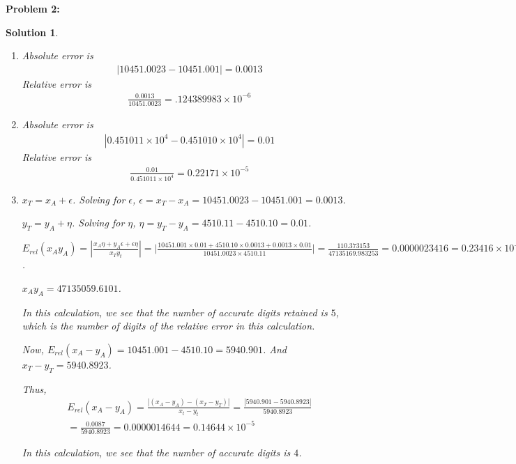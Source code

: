 \documentclass[12pt, letterpaper]{article}
\theoremstyle{nonumberplain}
\newtheorem{sol}{Solution}
\begin{document}
\newpage

\hspace{18pt}\textbf{Problem 2:} \medskip
\begin{sol}
	\begin{enumerate}[label=\alph*)]
		\item Absolute error is
		      \begin{gather*}
			      |10451.0023 - 10451.001| = 0.0013
		      \end{gather*}
		      Relative error is
		      \begin{gather*}
			      \frac{0.0013}{10451.0023} = .124389983 \times 10^{-6}
		      \end{gather*}
		\item Absolute error is
		      \begin{gather*}
			      |0.451011 \times 10^4 - 0.451010\times 10^4| = 0.01
		      \end{gather*}
		      Relative error is
		      \begin{gather*}
			      \frac{0.01}{0.451011\times 10^4} = 0.22171 \times 10^{-5}
		      \end{gather*}
		\item $x_T = x_A + \epsilon$. Solving for $\epsilon$, $\epsilon = x_T - x_A = 10451.0023 - 10451.001 = 0.0013$.

		      $y_T = y_A + \eta$. Solving for $\eta$, $\eta = y_T - y_A = 4510.11 - 4510.10 = 0.01$.

		      $E_{rel}(x_Ay_A) = | \frac{x_A\eta + y_A\epsilon + \epsilon \eta}{x_Ty_t} | = \Big|  \frac{10451.001 \times 0.01 + 4510.10 \times 0.0013 + 0.0013 \times 0.01}{10451.0023 \times 4510.11} | = \frac{110.373153}{47135169.983253} = 0.0000023416 = 0.23416\times 10^{-5}$.

		      $x_Ay_A = 47135059.6101$.

		      In this calculation, we see that the number of accurate digits retained is $5$, which is the number of digits of the relative error in this calculation.

		      Now, $E_{rel}(x_A - y_A) = 10451.001 - 4510.10 = 5940.901$. And $x_T - y_T = 5940.8923$.

		      Thus,
		      \begin{gather*}
			      E_{rel}(x_A - y_A) = \frac{|(x_A - y_A) - (x_T - y_T)|}{x_t - y_t}  = \frac{|5940.901 - 5940.8923|}{5940.8923} \\
			      = \frac{0.0087}{5940.8923} = 0.0000014644 = 0.14644 \times 10^{-5}
		      \end{gather*}

		      In this calculation, we see that the number of accurate digits is $4$.
	\end{enumerate}
\end{sol}
\end{document}
